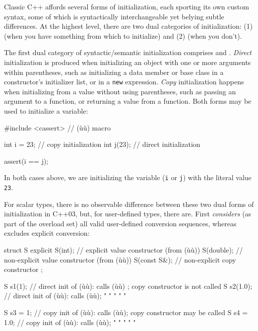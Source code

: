 Classic C++ affords several forms of initialization, each sporting its
own custom syntax, some of which is syntactically interchangeable yet
belying subtle differences. At the highest level, there are two dual
categories of initialization: (1)  (when you have
something from which to initialize) and (2)  (when
you don't).

The first dual category of syntactic/semantic initialization comprises
 and . \emph{Direct} initialization is produced when
initializing an object with one or more arguments within parentheses,
such as initializing a data member or base class in a constructor's
initializer list, or in a \lstinline!new! expression. \emph{Copy}
initialization happens when initializing from a value without using
parentheses, such as passing an argument to a function, or returning a
value from a function. Both forms may be used to initialize a variable:

\begin{emcppslisting}
#include <cassert>  // (ù{}ù) macro

int i = 23;  // copy initialization
int j(23);   // direct initialization

assert(i == j);
\end{emcppslisting}

\noindent In both cases above, we are initializing the variable (\lstinline!i! or
\lstinline!j!) with the literal value \lstinline!23!.

For scalar types, there is no observable difference between these two
dual forms of initialization in C++03, but, for user-defined types,
there are. First  \emph{considers} (as
part of the overload set) all valid user-defined conversion sequences,
whereas  excludes explicit conversion:

\begin{emcppslisting}
struct S
{
    explicit S(int);       //     explicit value constructor (from (ù{}ù))
             S(double);    // non-explicit value constructor (from (ù{}ù))
             S(const S&);  // non-explicit copy  constructor
};

S s1(1);     // direct init of (ù{}ù): calls (ù{}ù)   ; copy constructor is not called
S s2(1.0);   // direct init of (ù{}ù): calls (ù{}ù);   "      "        "   "     "

S s3 = 1;    // copy init of (ù{}ù):   calls (ù{}ù); copy constructor may be called
S s4 = 1.0;  // copy init of (ù{}ù):   calls (ù{}ù);   "      "         "    "   "
\end{emcppslisting}

